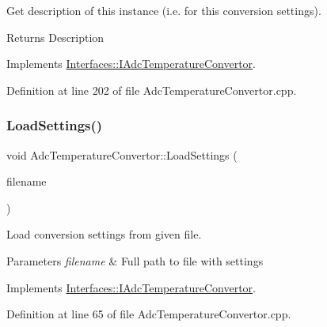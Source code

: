 Get description of this instance (i.\+e. for this conversion settings). 

\begin{DoxyReturn}{Returns}
Description 
\end{DoxyReturn}


Implements \hyperlink{class_interfaces_1_1_i_adc_temperature_convertor_a2f3b59be793c3ed43e880ef12e9749bc}{Interfaces\+::\+I\+Adc\+Temperature\+Convertor}.



Definition at line 202 of file Adc\+Temperature\+Convertor.\+cpp.

\mbox{\label{class_adc_temperature_convertor_affab0a66a3508e2eedd8bab3407ae80f}} 
\subsubsection{\texorpdfstring{Load\+Settings()}{LoadSettings()}}
{\footnotesize\ttfamily void Adc\+Temperature\+Convertor\+::\+Load\+Settings (\begin{DoxyParamCaption}\item[{Q\+String}]{filename }\end{DoxyParamCaption})\hspace{0.3cm}{\ttfamily [virtual]}}



Load conversion settings from given file. 


\begin{DoxyParams}{Parameters}
{\em filename} & Full path to file with settings \\
\hline
\end{DoxyParams}


Implements \hyperlink{class_interfaces_1_1_i_adc_temperature_convertor_a9697a0319f82ebd1fc20f5e24d3b191c}{Interfaces\+::\+I\+Adc\+Temperature\+Convertor}.



Definition at line 65 of file Adc\+Temperature\+Convertor.\+cpp.

\mbox{\label{class_adc_temperature_convertor_aa6935469c6bb9e2df9a21495d7e8b72a}} 
